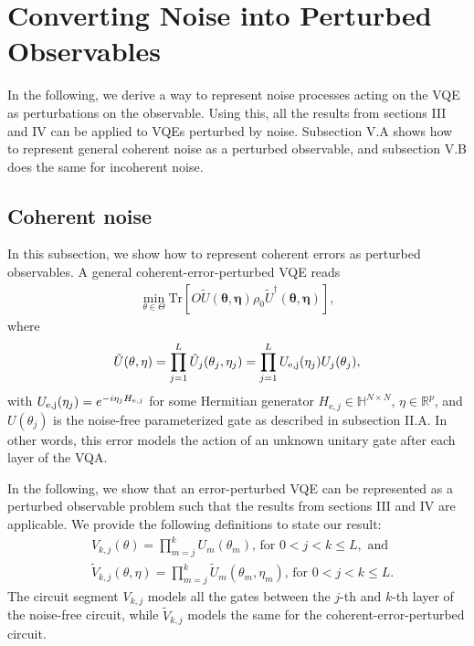 \documentclass[letterpaper, 10 pt]{IEEEtran}  %
\newcommand{\Tr}{\mathrm{Tr}}
\begin{document}
\section{Converting Noise into Perturbed Observables}
In the following, we derive a way to represent noise processes acting on the VQE as perturbations on the observable.
Using this, all the results from sections III and IV can be applied to VQEs perturbed by noise. 
Subsection V.A shows how to represent general coherent noise as a perturbed observable, and subsection V.B does the same for incoherent noise.  
\subsection{Coherent noise}
In this subsection, we show how to represent coherent errors as perturbed observables. 
A general coherent-error-perturbed VQE reads
\begin{align}
    \min_{\theta \in \Theta} \Tr[O \tilde{U}(\mathbf{\theta, \eta})\rho_0\tilde{U}^\dagger(\mathbf{\theta, \eta})], \label{coherentperturbedproblem}
\end{align} 
where 
\begin{align}
   \tilde{U}(\mathbf{\theta, \eta})=\prod_{j=1}^L \tilde{U}_j (\theta_j, \eta_j)=\prod_{j=1}^L U_{\rm{e},j}(\eta_j)U_j(\theta_j),
\end{align}
with $U_{\rm{e},j}(\eta_j)=e^{-i\eta_j H_{\mathrm{e},j}}$ for some Hermitian generator $H_{\mathrm{e},j} \in \mathbb{H}^{N \times N}$, $\eta \in \mathbb{R}^p$, 
and $U(\theta_j)$ is the noise-free parameterized gate as described in subsection II.A. 
In other words, this error models the action of an unknown unitary gate after each layer of the VQA.

In the following, we show that an error-perturbed VQE can be represented as a perturbed observable problem such that the results from sections III and IV are applicable.
We provide the following definitions to state our result:
\begin{align}
   & V_{k,j}(\theta)=\prod_{m=j}^k U_m (\theta_m) \text{, for } 0<j<k\le L, \text{ and }\\
   & \tilde{V}_{k,j}(\theta, \eta)=\prod_{m=j}^k \tilde{U}_m (\theta_m, \eta_m) \text{, for }  0<j<k\le L.
\end{align}
The circuit segment $V_{k,j}$ models all the gates between the $j$-th and $k$-th layer of the noise-free circuit, while $\tilde{V}_{k,j}$ models the same for the coherent-error-perturbed circuit. 
\end{document}
